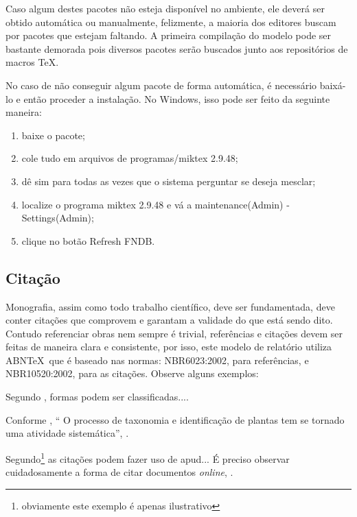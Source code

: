 Caso algum destes pacotes não esteja disponível no ambiente, ele deverá ser obtido automática ou manualmente, felizmente, a maioria dos editores buscam por pacotes que estejam faltando. A primeira compilação do modelo pode ser bastante demorada pois diversos pacotes serão buscados junto aos repositórios de macros \TeX.

No caso de não conseguir algum pacote de forma automática, é necessário baixá-lo e então proceder a instalação. No Windows, isso pode ser feito da seguinte maneira:


\begin{enumerate}
\item baixe o pacote;

\item cole tudo em arquivos de programas/miktex 2.9.48;

\item dê sim para todas as vezes que o sistema perguntar se deseja mesclar;

\item localize o programa miktex 2.9.48 e vá a maintenance(Admin) - Settings(Admin);

\item clique no botão Refresh FNDB.

\end{enumerate}



\subsection{Citação}

Monografia, assim como todo trabalho científico, deve ser fundamentada, deve conter citações que comprovem e garantam a validade do que está sendo dito. Contudo referenciar obras nem sempre é trivial, referências e citações devem ser feitas de maneira clara e consistente, por isso, este modelo de relatório utiliza ABN\TeX\ que é baseado nas normas: NBR6023:2002,  para referências, e NBR10520:2002,  para as citações. Observe alguns exemplos:

Segundo , formas podem ser classificadas....
 
Conforme , `` O processo de taxonomia e identificação de plantas tem se tornado uma atividade sistemática'', \cite[p~1]{rossatto}.
 

Segundo\footnote{obviamente este exemplo é apenas ilustrativo}  as citações podem fazer uso de apud...
 \cite{smole}
É preciso observar cuidadosamente a forma de citar documentos \textit{online}, \cite{wikipedia}.

